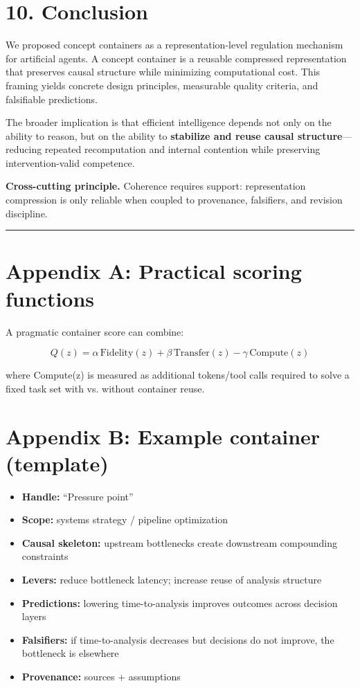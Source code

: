 \documentclass[11pt]{article}
\begin{document}
\section*{10. Conclusion}
We proposed concept containers as a representation-level regulation mechanism for artificial agents. A concept container is a reusable compressed representation that preserves causal structure while minimizing computational cost. This framing yields concrete design principles, measurable quality criteria, and falsifiable predictions.

The broader implication is that efficient intelligence depends not only on the ability to reason, but on the ability to \textbf{stabilize and reuse causal structure}—reducing repeated recomputation and internal contention while preserving intervention-valid competence.

\noindent\textbf{Cross-cutting principle.} Coherence requires support: representation compression is only reliable when coupled to provenance, falsifiers, and revision discipline.

\hrule


\section*{Appendix A: Practical scoring functions}

A pragmatic container score can combine:

\[
Q(z) = \alpha\,\text{Fidelity}(z) + \beta\,\text{Transfer}(z) - \gamma\,\text{Compute}(z)
\]

where Compute(z) is measured as additional tokens/tool calls required to solve a fixed task set with vs. without container reuse.

\section*{Appendix B: Example container (template)}
\begin{itemize}
\item \textbf{Handle:} “Pressure point”
\item \textbf{Scope:} systems strategy / pipeline optimization
\item \textbf{Causal skeleton:} upstream bottlenecks create downstream compounding constraints
\item \textbf{Levers:} reduce bottleneck latency; increase reuse of analysis structure
\item \textbf{Predictions:} lowering time-to-analysis improves outcomes across decision layers
\item \textbf{Falsifiers:} if time-to-analysis decreases but decisions do not improve, the bottleneck is elsewhere
\item \textbf{Provenance:} sources + assumptions
\end{itemize}
\end{document}
